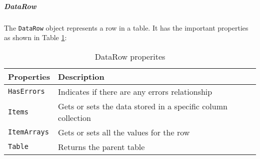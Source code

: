 \subparagraph*{DataRow}
The \texttt{DataRow} object represents a row in a table. It has the important properties as shown in Table \ref{tab:data-row-prop}:

\begin{table}[ht!]
	\centering
	\caption{DataRow properites}\label{tab:data-row-prop}
\begin{tabular}{p{3cm}p{9cm}}
	\toprule
	\textbf{Properties} & \textbf{Description}                                         \\ \midrule
	\texttt{HasErrors}  & Indicates if there are any errors relationship               \\
	\texttt{Items}      & Gets or sets the data stored in a specific column collection \\
	\texttt{ItemArrays} & Gets or sets all the values for the row                      \\
	\texttt{Table}      & Returns the parent table                                     \\ \bottomrule
\end{tabular}
\end{table}



%
%

